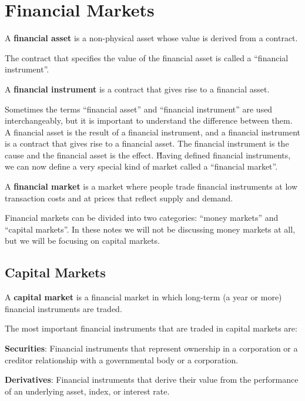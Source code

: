 \section{Financial Markets}

A \textbf{financial asset} is a non-physical asset whose value is derived from a contract.
\ed

The contract that specifies the value of the financial asset is called a ``financial instrument''.

A \textbf{financial instrument} is a contract that gives rise to a financial asset.
\ed

Sometimes the terms ``financial asset'' and ``financial instrument'' are used interchangeably, but it is important to
understand the difference between them. A financial asset is the result of a financial instrument, and a financial
instrument is a contract that gives rise to a financial asset. The financial instrument is the cause and the financial
asset is the effect. \v

Having defined financial instruments, we can now define a very special kind of market called a ``financial market''.

A \textbf{financial market} is a market where people trade financial instruments at low transaction costs and at prices
that reflect supply and demand.
\ed

Financial markets can be divided into two categories: ``money markets'' and ``capital markets''. In these notes we will
not be discussing money markets at all, but we will be focusing on capital markets.

\subsection{Capital Markets}

A \textbf{capital market} is a financial market in which long-term (a year or more) financial instruments are traded.
\ed

The most important financial instruments that are traded in capital markets are:
\bit
\item \textbf{Securities}: Financial instruments that represent ownership in a corporation or a creditor relationship
with a governmental body or a corporation.
\item \textbf{Derivatives}: Financial instruments that derive their value from the performance of an underlying asset,
index, or interest rate.
\eit

